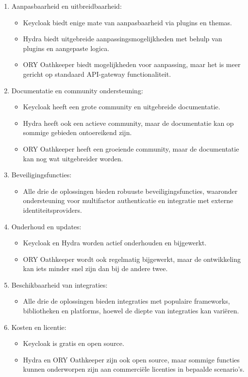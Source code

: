\begin{enumerate}
  \item Aanpasbaarheid en uitbreidbaarheid:
  \begin{itemize}
    \item Keycloak biedt enige mate van aanpasbaarheid via plugins en themas.
    \item Hydra biedt uitgebreide aanpassingsmogelijkheden met behulp van plugins en aangepaste logica.
    \item ORY Oathkeeper biedt mogelijkheden voor aanpassing, maar het is meer gericht op standaard API-gateway functionaliteit.
  \end{itemize}
  
  \item Documentatie en community ondersteuning:
  \begin{itemize}
    \item Keycloak heeft een grote community en uitgebreide documentatie.
    \item Hydra heeft ook een actieve community, maar de documentatie kan op sommige gebieden ontoereikend zijn.
    \item ORY Oathkeeper heeft een groeiende community, maar de documentatie kan nog wat uitgebreider worden.
  \end{itemize}
  
  \item Beveiligingsfuncties:
  \begin{itemize}
    \item Alle drie de oplossingen bieden robuuste beveiligingsfuncties, waaronder ondersteuning voor multifactor authenticatie en integratie met externe identiteitsproviders.
  \end{itemize}
  
  \item Onderhoud en updates:
  \begin{itemize}
    \item Keycloak en Hydra worden actief onderhouden en bijgewerkt.
    \item ORY Oathkeeper wordt ook regelmatig bijgewerkt, maar de ontwikkeling kan iets minder snel zijn dan bij de andere twee.
  \end{itemize}
  
  \item Beschikbaarheid van integraties:
  \begin{itemize}
    \item Alle drie de oplossingen bieden integraties met populaire frameworks, bibliotheken en platforms, hoewel de diepte van integraties kan variëren.
  \end{itemize}
  
  \item Kosten en licentie:
  \begin{itemize}
    \item Keycloak is gratis en open source.
    \item Hydra en ORY Oathkeeper zijn ook open source, maar sommige functies kunnen onderworpen zijn aan commerciële licenties in bepaalde scenario's.
  \end{itemize}
\end{enumerate}

